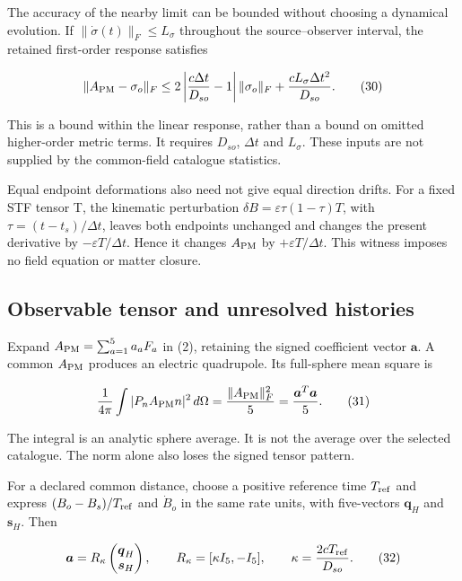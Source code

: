 \documentclass[aps,prd,preprint,onecolumn,notitlepage]{revtex4-2}
\begin{document}
The accuracy of the nearby limit can be bounded without choosing a dynamical evolution. If \(\|\dot\sigma(t)\|_F\le L_\sigma\) throughout the source--observer interval, the retained first-order response satisfies

\[
\|A_{\rm PM}-\sigma_o\|_F
\le 2\left|\frac{c\Delta t}{D_{so}}-1\right|\|\sigma_o\|_F
+\frac{c L_\sigma\Delta t^2}{D_{so}}.
\tag{30}
\]

This is a bound within the linear response, rather than a bound on omitted higher-order metric terms. It requires \(D_{so}\), \(\Delta t\) and \(L_\sigma\). These inputs are not supplied by the common-field catalogue statistics.

Equal endpoint deformations also need not give equal direction drifts. For a fixed STF tensor T, the kinematic perturbation \(\delta B=\varepsilon\tau(1-\tau)T\), with \(\tau=(t-t_s)/\Delta t\), leaves both endpoints unchanged and changes the present derivative by \(-\varepsilon T/\Delta t\). Hence it changes \(A_{\rm PM}\) by \(+\varepsilon T/\Delta t\). This witness imposes no field equation or matter closure.

\hypertarget{observable-tensor-and-unresolved-histories}{%
\subsection{Observable tensor and unresolved histories}\label{observable-tensor-and-unresolved-histories}}

Expand \(A_{\rm PM}=\sum_{a=1}^5 a_aF_a\) in (2), retaining the signed coefficient vector \(\boldsymbol a\). A common \(A_{\rm PM}\) produces an electric quadrupole. Its full-sphere mean square is

\[
\frac{1}{4\pi}\int |P_nA_{\rm PM}n|^2\,d\Omega
=\frac{\|A_{\rm PM}\|_F^2}{5}
=\frac{\boldsymbol a^T\boldsymbol a}{5}.
\tag{31}
\]

The integral is an analytic sphere average. It is not the average over the selected catalogue. The norm alone also loses the signed tensor pattern.

For a declared common distance, choose a positive reference time \(T_{\rm ref}\) and express \((B_o-B_s)/T_{\rm ref}\) and \(\dot B_o\) in the same rate units, with five-vectors \(\boldsymbol q_H\) and \(\boldsymbol s_H\). Then

\[
\boldsymbol a=R_\kappa
\begin{pmatrix}\boldsymbol q_H\\\boldsymbol s_H\end{pmatrix},
\qquad R_\kappa=[\kappa I_5,-I_5],\qquad
\kappa=\frac{2cT_{\rm ref}}{D_{so}}.
\tag{32}
\]
\end{document}
